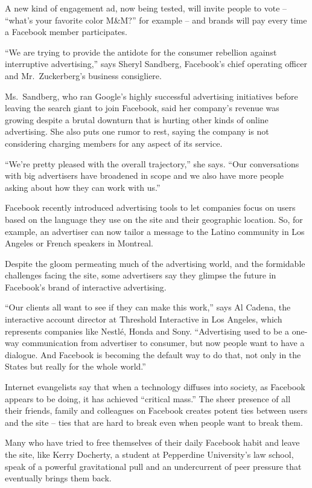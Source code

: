 \documentclass[12pt,a4paper,onecolumn]{article}
\begin{document}
A new kind of engagement ad, now being tested, will invite people to vote -- ``what's your favorite
color M\&M?'' for example -- and brands will pay every time a Facebook member participates.

``We are trying to provide the antidote for the consumer rebellion against interruptive
advertising,'' says Sheryl Sandberg, Facebook's chief operating officer and Mr.~Zuckerberg's
business consigliere.

Ms.~Sandberg, who ran Google's highly successful advertising initiatives before leaving the search
giant to join Facebook, said her company's revenue was growing despite a brutal downturn that is
hurting other kinds of online advertising. She also puts one rumor to rest, saying the company is
not considering charging members for any aspect of its service.

``We're pretty pleased with the overall trajectory,'' she says. ``Our conversations with big
advertisers have broadened in scope and we also have more people asking about how they can work with
us.''

Facebook recently introduced advertising tools to let companies focus on users based on the language
they use on the site and their geographic location. So, for example, an advertiser can now tailor a
message to the Latino community in Los Angeles or French speakers in Montreal.

Despite the gloom permeating much of the advertising world, and the formidable challenges facing the
site, some advertisers say they glimpse the future in Facebook's brand of interactive advertising.

``Our clients all want to see if they can make this work,'' says Al Cadena, the interactive account
director at Threshold Interactive in Los Angeles, which represents companies like Nestl\'e, Honda
and Sony. ``Advertising used to be a one-way communication from advertiser to consumer, but now
people want to have a dialogue. And Facebook is becoming the default way to do that, not only in the
States but really for the whole world.''

Internet evangelists say that when a technology diffuses into society, as Facebook appears to be
doing, it has achieved ``critical mass.'' The sheer presence of all their friends, family and
colleagues on Facebook creates potent ties between users and the site -- ties that are hard to break
even when people want to break them.

Many who have tried to free themselves of their daily Facebook habit and leave the site, like Kerry
Docherty, a student at Pepperdine University's law school, speak of a powerful gravitational pull
and an undercurrent of peer pressure that eventually brings them back.
\end{document}
